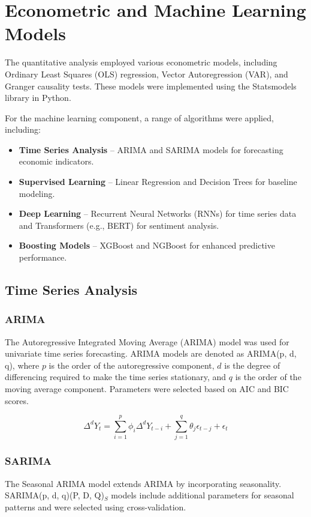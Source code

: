 \section{Econometric and Machine Learning Models}
\label{sec:models}
The quantitative analysis employed various econometric models, including Ordinary Least Squares (OLS) regression, Vector Autoregression (VAR), and Granger causality tests. These models were implemented using the Statsmodels library in Python.

For the machine learning component, a range of algorithms were applied, including:

\begin{itemize}
  \item \textbf{Time Series Analysis} -- ARIMA and SARIMA models for forecasting economic indicators.
  \item \textbf{Supervised Learning} -- Linear Regression and Decision Trees for baseline modeling.
  \item \textbf{Deep Learning} -- Recurrent Neural Networks (RNNs) for time series data and Transformers (e.g., BERT) for sentiment analysis.
  \item \textbf{Boosting Models} -- XGBoost and NGBoost for enhanced predictive performance.
\end{itemize}

\subsection{Time Series Analysis}
\label{sec:time-series-analysis}

\subsubsection{ARIMA}
\label{sec:arima}
The Autoregressive Integrated Moving Average (ARIMA) model was used for univariate time series forecasting. ARIMA models are denoted as ARIMA(p, d, q), where $p$ is the order of the autoregressive component, $d$ is the degree of differencing required to make the time series stationary, and $q$ is the order of the moving average component. Parameters were selected based on AIC and BIC scores.

\begin{equation}
  \Delta^d Y_t = \sum_{i=1}^{p} \phi_i \Delta^d Y_{t-i} + \sum_{j=1}^{q} \theta_j \epsilon_{t-j} + \epsilon_t
\end{equation}

\subsubsection{SARIMA}
\label{sec:sarima}
The Seasonal ARIMA model extends ARIMA by incorporating seasonality. SARIMA(p, d, q)(P, D, Q)$_S$ models include additional parameters for seasonal patterns and were selected using cross-validation.

